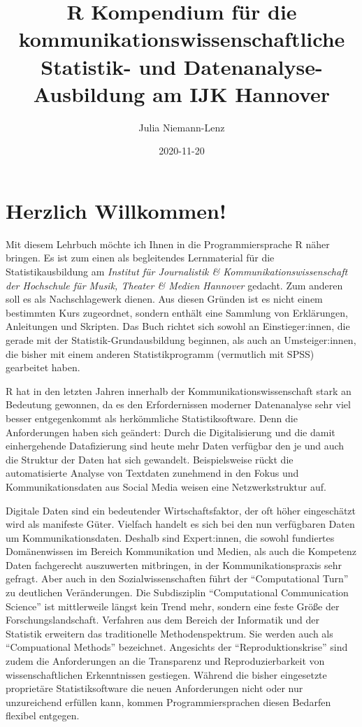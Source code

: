 \documentclass[
]{book}
\title{R Kompendium für die kommunikationswissenschaftliche Statistik- und Datenanalyse-Ausbildung am IJK Hannover}
\author{Julia Niemann-Lenz}
\date{2020-11-20}
\begin{document}
\maketitle

{
\setcounter{tocdepth}{1}
\tableofcontents
}
\hypertarget{herzlich-willkommen}{%
\chapter*{Herzlich Willkommen!}\label{herzlich-willkommen}}

Mit diesem Lehrbuch möchte ich Ihnen in die Programmiersprache R näher bringen. Es ist zum einen als begleitendes Lernmaterial für die Statistikausbildung am \emph{Institut für Journalistik \& Kommunikationswissenschaft der Hochschule für Musik, Theater \& Medien Hannover} gedacht. Zum anderen soll es als Nachschlagewerk dienen. Aus diesen Gründen ist es nicht einem bestimmten Kurs zugeordnet, sondern enthält eine Sammlung von Erklärungen, Anleitungen und Skripten. Das Buch richtet sich sowohl an Einstieger:innen, die gerade mit der Statistik-Grundausbildung beginnen, als auch an Umsteiger:innen, die bisher mit einem anderen Statistikprogramm (vermutlich mit SPSS) gearbeitet haben.

R hat in den letzten Jahren innerhalb der Kommunikationswissenschaft stark an Bedeutung gewonnen, da es den Erfordernissen moderner Datenanalyse sehr viel besser entgegenkommt als herkömmliche Statistiksoftware. Denn die Anforderungen haben sich geändert: Durch die Digitalisierung und die damit einhergehende Datafizierung sind heute mehr Daten verfügbar den je und auch die Struktur der Daten hat sich gewandelt. Beispielsweise rückt die automatisierte Analyse von Textdaten zunehmend in den Fokus und Kommunikationsdaten aus Social Media weisen eine Netzwerkstruktur auf.

Digitale Daten sind ein bedeutender Wirtschaftsfaktor, der oft höher eingeschätzt wird als manifeste Güter. Vielfach handelt es sich bei den nun verfügbaren Daten um Kommunikationsdaten. Deshalb sind Expert:innen, die sowohl fundiertes Domänenwissen im Bereich Kommunikation und Medien, als auch die Kompetenz Daten fachgerecht auszuwerten mitbringen, in der Kommunikationspraxis sehr gefragt. Aber auch in den Sozialwissenschaften führt der ``Computational Turn'' zu deutlichen Veränderungen. Die Subdisziplin ``Computational Communication Science'' ist mittlerweile längst kein Trend mehr, sondern eine feste Größe der Forschungslandschaft. Verfahren aus dem Bereich der Informatik und der Statistik erweitern das traditionelle Methodenspektrum. Sie werden auch als ``Compuational Methods'' bezeichnet. Angesichts der ``Reproduktionskrise'' sind zudem die Anforderungen an die Transparenz und Reproduzierbarkeit von wissenschaftlichen Erkenntnissen gestiegen. Während die bisher eingesetzte proprietäre Statistiksoftware die neuen Anforderungen nicht oder nur unzureichend erfüllen kann, kommen Programmiersprachen diesen Bedarfen flexibel entgegen.
\end{document}
